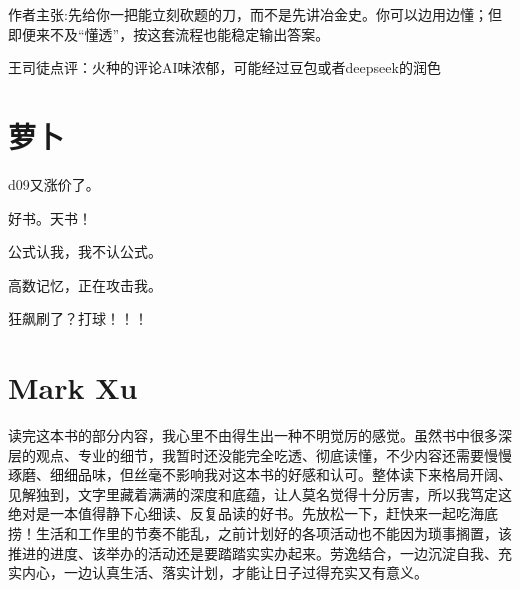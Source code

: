\documentclass[12pt]{report}
\begin{document}
 作者主张:先给你一把能立刻砍题的刀，而不是先讲冶金史。你可以边用边懂；但即便来不及“懂透”，按这套流程也能稳定输出答案。
 
 王司徒点评：火种的评论AI味浓郁，可能经过豆包或者deepseek的润色
 
 \section*{萝卜}
 
 d09又涨价了。
 
 好书。天书！
 
 公式认我，我不认公式。
 
 高数记忆，正在攻击我。
 
 狂飙刷了？打球！！！
 
 \section*{Mark Xu}
 
 读完这本书的部分内容，我心里不由得生出一种不明觉厉的感觉。虽然书中很多深层的观点、专业的细节，我暂时还没能完全吃透、彻底读懂，不少内容还需要慢慢琢磨、细细品味，但丝毫不影响我对这本书的好感和认可。整体读下来格局开阔、见解独到，文字里藏着满满的深度和底蕴，让人莫名觉得十分厉害，所以我笃定这绝对是一本值得静下心细读、反复品读的好书。先放松一下，赶快来一起吃海底捞！生活和工作里的节奏不能乱，之前计划好的各项活动也不能因为琐事搁置，该推进的进度、该举办的活动还是要踏踏实实办起来。劳逸结合，一边沉淀自我、充实内心，一边认真生活、落实计划，才能让日子过得充实又有意义。
 

 
 

   
   
   \clearpage %
   
   
   \tableofcontents %
   \clearpage %
   
	\setcounter{chapter}{0} 
	 
	\clearpage
	
\end{document}
